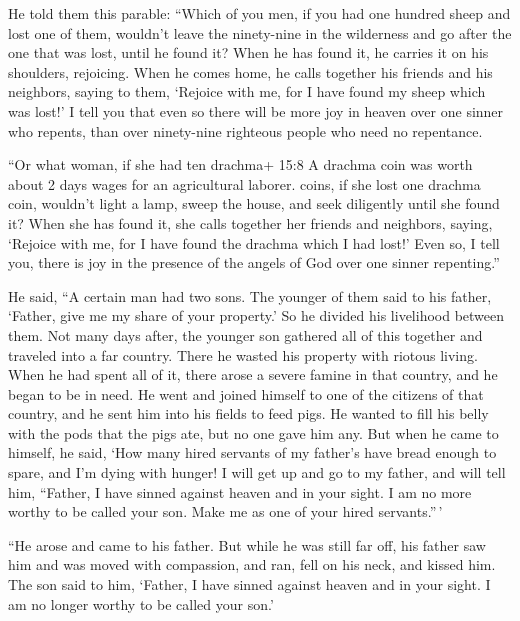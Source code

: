  He told them this parable:  ``Which of you men,
if you had one hundred sheep and lost one of them, wouldn't leave the
ninety-nine in the wilderness and go after the one that was lost, until
he found it?  When he has found it, he carries it on his
shoulders, rejoicing.  When he comes home, he calls together
his friends and his neighbors, saying to them, `Rejoice with me, for I
have found my sheep which was lost!'  I tell you that even
so there will be more joy in heaven over one sinner who repents, than
over ninety-nine righteous people who need no repentance.

 ``Or what woman, if she had ten drachma+ 15:8 A drachma
coin was worth about 2 days wages for an agricultural laborer. coins, if
she lost one drachma coin, wouldn't light a lamp, sweep the house, and
seek diligently until she found it?  When she has found it,
she calls together her friends and neighbors, saying, `Rejoice with me,
for I have found the drachma which I had lost!'  Even so, I
tell you, there is joy in the presence of the angels of God over one
sinner repenting.''

 He said, ``A certain man had two sons.  The
younger of them said to his father, `Father, give me my share of your
property.' So he divided his livelihood between them.  Not
many days after, the younger son gathered all of this together and
traveled into a far country. There he wasted his property with riotous
living.  When he had spent all of it, there arose a severe
famine in that country, and he began to be in need.  He
went and joined himself to one of the citizens of that country, and he
sent him into his fields to feed pigs.  He wanted to fill
his belly with the pods that the pigs ate, but no one gave him any.
 But when he came to himself, he said, `How many hired
servants of my father's have bread enough to spare, and I'm dying with
hunger!  I will get up and go to my father, and will tell
him, ``Father, I have sinned against heaven and in your sight.
 I am no more worthy to be called your son. Make me as one
of your hired servants.''\,'

 ``He arose and came to his father. But while he was still
far off, his father saw him and was moved with compassion, and ran, fell
on his neck, and kissed him.  The son said to him, `Father,
I have sinned against heaven and in your sight. I am no longer worthy to
be called your son.'

